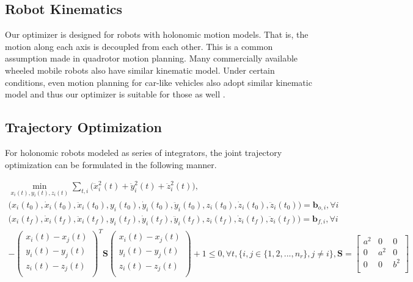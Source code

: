 \subsection{Robot Kinematics}
\noindent Our optimizer is designed for robots with holonomic motion models. That is, the motion along each axis is decoupled from each other. This is a common assumption made in quadrotor motion planning. Many commercially available wheeled mobile robots also have similar kinematic model. Under certain conditions, even motion planning for car-like vehicles also adopt similar kinematic model and thus our optimizer is suitable for those as well \cite{frenet_planner}.


\subsection{Trajectory Optimization }
\noindent For holonomic robots modeled as series of integrators, the joint trajectory optimization can be formulated in the following manner.

\begin{subequations}
\begin{align}
\min_{x_{i}(t), y_{i}(t), z_{i}(t)} \sum_{t, i} \Big(\ddot{x}_{i}^2(t)+\ddot{y}_{i}^2(t)+\ddot{z}_{i}^2(t)\Big),\label{cost_multirobot} \\
\Big(x_i(t_0), \dot{x}_i(t_0), \ddot{x}_i(t_0), y_i(t_0), \dot{y}_i(t_0), \ddot{y}_i(t_0), z_i(t_0), \dot{z}_i(t_0), \ddot{z}_i(t_0)) = \textbf{b}_{o, i}, \forall i \label{initial_boundary_cond} \\
\Big(x_i(t_f), \dot{x}_i(t_f), \ddot{x}_i(t_f), y_i(t_f), \dot{y}_i(t_f), \ddot{y}_i(t_f), z_i(t_f), \dot{z}_i(t_f), \ddot{z}_i(t_f)) = \textbf{b}_{f, i}, \forall i \label{final_boundary_cond} \\
  -\left(\begin{matrix}
 x_i(t)-x_j(t)\\
 y_i(t)-y_j(t)\\
 z_i(t)-z_j(t)\\
 \end{matrix}\right)^T\textbf{S}\left(\begin{matrix}
 x_i(t)-x_j(t)\\
 y_i(t)-y_j(t)\\
 z_i(t)-z_j(t)\\
 \end{matrix}\right)+1 \leq 0, \forall t,  \{i,j \in \{1,2,...,n_{r}\}, j \neq  i\} \label{coll_multirobot}, \textbf{S} = \begin{bmatrix}
 a^2 & 0 & 0 \\
 0 & a^2 & 0 \\
 0 & 0 & b^2 \\
 \end{bmatrix}
 \end{align}
\end{subequations}

